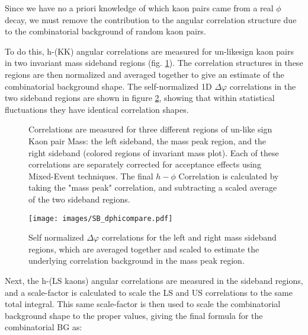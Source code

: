 \documentclass[ALICE,manyauthors]{ALICE_analysis_notes}
\begin{document}
Since we have no a priori knowledge of which kaon pairs came from a real $\phi$ decay, we must remove the contribution to the angular correlation structure due to the combinatorial background of random kaon pairs.

To do this, h-(KK) angular correlations are measured for un-likesign kaon pairs in two invariant mass sideband regions (fig. \ref{sidebands}).  The correlation structures in these regions are then normalized and averaged together to give an estimate of the combinatorial background shape.  The self-normalized 1D $\Delta\varphi$ correlations in the two sideband regions are shown in figure \ref{normSBcorr}, showing that within statistical fluctuations they have identical correlation shapes.

\begin{figure}[ht]
\centering
\begin{subfigure}{
\texttt{[image: images/narrowmass\_withSB\_invmass.pdf]}}
\end{subfigure}
\begin{subfigure}{
\texttt{[image: images/dphi\_masspeak.pdf]}}
\end{subfigure}
\begin{subfigure}{
\texttt{[image: images/dphi\_LSB.pdf]}}
\end{subfigure}
\begin{subfigure}{
\texttt{[image: images/dphi\_RSB.pdf]}}
\end{subfigure}
\caption{Correlations are measured for three different regions of un-like sign Kaon pair Mass: the left sideband, the mass peak region, and the right sideband (colored regions of invariant mass plot). Each of these correlations are separately corrected for acceptance effects using Mixed-Event techniques. The final $h-\phi$ Correlation is calculated by taking the "mass peak" correlation, and subtracting a scaled average of the two sideband regions.}
\label{sidebands}
\end{figure}

\begin{figure}[ht]
\centering
\label{normSBcorr}
\texttt{[image: images/SB\_dphicompare.pdf]}
\caption{Self normalized $\Delta\varphi$ correlations for the left and right mass sideband regions, which are averaged together and scaled to estimate the underlying correlation background in the mass peak region.}
\end{figure}

Next, the h-(LS kaons) angular correlations are measured in the sideband regions, and a scale-factor is calculated to scale the LS and US correlations to the same total integral.  This same scale-factor is then used to scale the combinatorial background shape to the proper values, giving the final formula for the combinatorial BG as:
\end{document}
